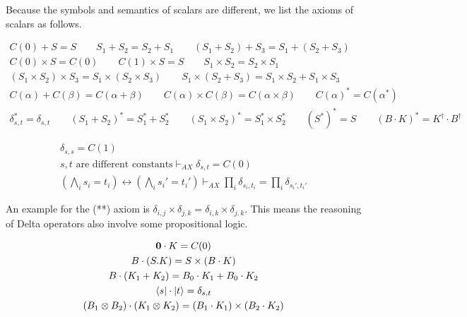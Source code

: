 \documentclass[manuscript, review, timestamp]{acmart}
\begin{document}
Because the symbols and semantics of scalars are different, we list the axioms of scalars as follows.

\begin{definition}
  \begin{gather*}
    C(0) + S = S
    \qquad
    S_1 + S_2 = S_2 + S_1
    \qquad
    (S_1 + S_2) + S_3 = S_1 + (S_2 + S_3) \\
    C(0) \times S = C(0)
    \qquad
    C(1) \times S = S
    \qquad
    S_1 \times S_2 = S_2 \times S_1 \\
    (S_1 \times S_2) \times S_3 = S_1 \times (S_2 \times S_3)
    \qquad
    S_1 \times (S_2 + S_3) = S_1 \times S_2 + S_1 \times S_3 \\
    C(\alpha) + C(\beta) = C(\alpha + \beta)
    \qquad
    C(\alpha) \times C(\beta) = C(\alpha \times \beta)
    \qquad
    C(\alpha)^* = C(\alpha^*) \\
    \delta_{s, t}^* = \delta_{s, t}
    \qquad
    (S_1 + S_2)^* = S_1^* + S_2^*
    \qquad
    (S_1 \times S_2)^* = S_1^* \times S_2^*
    \qquad
    (S^*)^* = S
    \qquad
    (B \cdot K)^* = K^\dagger \cdot B^\dagger
  \end{gather*}  
\end{definition}

\begin{definition}
  \label{def: SCR-DELTA}
  \begin{gather*}
    \delta_{s, s} = C(1) \\
    s, t \text{ are different constants} \vdash_{AX} \delta_{s, t} = C(0)  \tag{*} \\
    (\bigwedge_i s_i = t_i) \leftrightarrow (\bigwedge_i s_i' = t_i') \vdash_{AX} \prod_i \delta_{s_i, t_i} = \prod_i \delta_{s_i', t_i'} \tag{**}
  \end{gather*}
\end{definition}

An example for the (**) axiom is $\delta_{i, j} \times \delta_{j, k} = \delta_{i, k} \times \delta_{j, k}$. This means the reasoning of Delta operators also involve some propositional logic.

\begin{definition}
  \begin{gather*}
    \mathbf{0} \cdot K = C(0) \\
    B \cdot (S.K) = S \times (B \cdot K) \\
    B \cdot (K_1 + K_2) = B_0 \cdot K_1 + B_0 \cdot K_2 \\
    \bra{s} \cdot \ket{t} = \delta_{s, t} \\
    (B_1 \otimes B_2) \cdot (K_1 \otimes K_2) = (B_1 \cdot K_1) \times (B_2 \cdot K_2)
  \end{gather*}
\end{definition}
\end{document}
